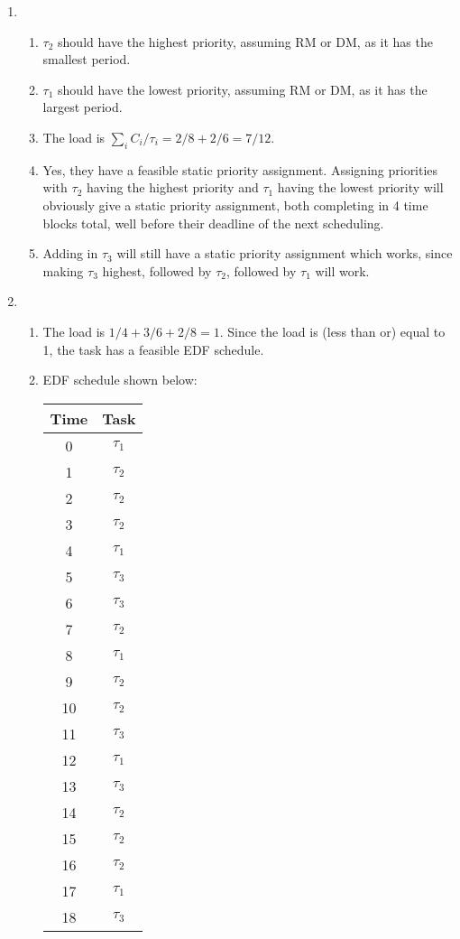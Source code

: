 \documentclass[12pt,letterpaper]{report}
\begin{document}
\begin{enumerate}
\item \begin{enumerate}
\item $\tau_2$ should have the highest priority, assuming RM or DM, as it has the smallest period.
\item $\tau_1$ should have the lowest priority, assuming RM or DM, as it has the largest period.
\item The load is $\sum_i C_i/\tau_i=2/8 + 2/6= 7/12$.
\item Yes, they have a feasible static priority assignment. Assigning priorities with $\tau_2$ having the highest priority and $\tau_1$ having the lowest priority will obviously give a static priority assignment, both completing in 4 time blocks total, well before their deadline of the next scheduling.
\item Adding in $\tau_3$ will still have a static priority assignment which works, since making $\tau_3$ highest, followed by $\tau_2$, followed by $\tau_1$ will work.
\end{enumerate}
\item
\begin{enumerate}
\item The load is $1/4 + 3/6 + 2/8=1$. Since the load is (less than or) equal to 1, the task has a feasible EDF schedule.
\item EDF schedule shown below:\\
\begin{tabular}{|c|c|}
\hline 
Time & Task\\
\hline
0 & $\tau_1$\\
1 & $\tau_2$\\
2 & $\tau_2$\\
3 & $\tau_2$\\
4 & $\tau_1$\\
5 & $\tau_3$\\
6 & $\tau_3$\\
7 & $\tau_2$\\
8 & $\tau_1$\\
9 & $\tau_2$\\
10 & $\tau_2$\\
11 & $\tau_3$\\
12 & $\tau_1$\\
13 & $\tau_3$\\
14 & $\tau_2$\\
15 & $\tau_2$\\
16 & $\tau_2$\\
17 & $\tau_1$\\
18 & $\tau_3$\\

\end{tabular}
\end{enumerate}
\end{enumerate}
\end{document}
